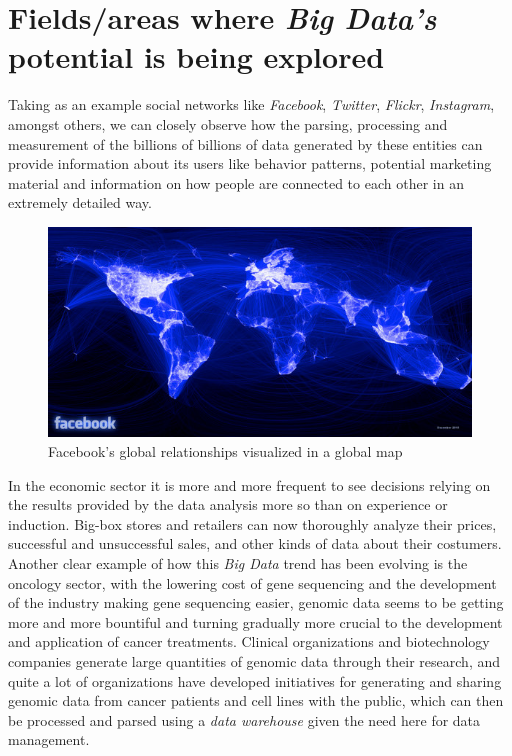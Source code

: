 \documentclass{llncs}
\begin{document}
\section{Fields/areas where \textit{Big Data's} potential is being explored}

Taking as an example social networks like \textit{Facebook}, \textit{Twitter}, \textit{Flickr}, \textit{Instagram}, amongst others, we can closely observe how the parsing, processing and measurement of the billions of billions of data generated by these entities can provide information about its users like behavior patterns, potential marketing material and information on how people are connected to each other in an extremely detailed way.~\cite{Lohr2012}

\begin{figure}[ht!]
\centering
\includegraphics[scale=0.77]{facebook_visualised.jpg}
\caption{Facebook’s global relationships visualized in a global map~\cite{facebookRel}}
\label{fig:minipage1}
\end{figure}

\newpage

In the economic sector it is more and more frequent to see decisions relying on the results provided by the data analysis more so than on experience or induction. Big-box stores and retailers can now thoroughly analyze their prices, successful and unsuccessful sales, and other kinds of data about their costumers.~\cite{Lohr2012}\\

Another clear example of how this \textit{Big Data} trend has been evolving is the oncology sector, with the lowering cost of gene sequencing and the development of the industry making gene sequencing easier, genomic data seems to be getting more and more bountiful and turning gradually more crucial to the development and application of cancer treatments. Clinical organizations and biotechnology companies generate large quantities of genomic data through their research, and quite a lot of organizations have developed initiatives for generating and sharing genomic data from cancer patients and cell lines with the public, which can then be processed and parsed using a \textit{data warehouse} given the need here for data management.~\cite{Tressider2014}~\cite{Lohr2012}
\end{document}
